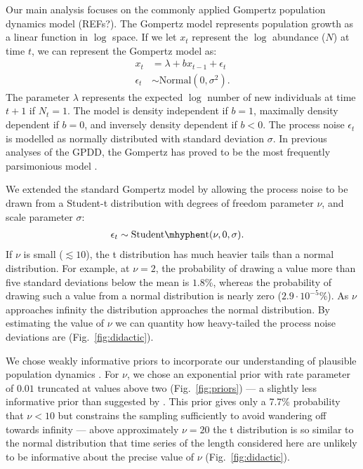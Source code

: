 Our main analysis focuses on the commonly applied Gompertz population dynamics
model (REFs?). The Gompertz model represents population growth as a linear
function in $\log$ space. If we let $x_t$ represent the $\log$ abundance ($N$)
at time $t$, we can represent the Gompertz model as:
\begin{align*}
x_t &= \lambda + b x_{t-1} + \epsilon_t\\
\epsilon_t &\sim \mathrm{Normal}(0, \sigma^2).
\end{align*}
The parameter $\lambda$ represents the expected $\log$ number of new
individuals at time $t + 1$ if $N_t = 1$. The model is density independent if
$b = 1$, maximally density dependent if $b = 0$, and inversely density
dependent if $b < 0$. The process noise $\epsilon_t$ is modelled as normally
distributed with standard deviation $\sigma$. In previous analyses of the GPDD,
the Gompertz has proved to be the most frequently parsimonious model
\citep{brook2006}.

We extended the standard Gompertz model by allowing the process noise to be
drawn from a Student-t distribution with degrees of freedom parameter $\nu$, and scale parameter $\sigma$:
\begin{align*}
\epsilon_t &\sim \mathrm{Student\mhyphen t}(\nu, 0, \sigma).
\end{align*}
If $\nu$ is small ($\lesssim 10$), the t distribution has much heavier tails
than a normal distribution. For example, at $\nu = 2$, the probability of
drawing a value more than five standard deviations below the mean is $1.8$\%,
whereas the probability of drawing such a value from a normal distribution is
nearly zero ($2.9\cdot10^{-5}$\%). As $\nu$ approaches infinity the
distribution approaches the normal distribution. By estimating the value of
$\nu$ we can quantity how heavy-tailed the process noise deviations are
(Fig.~\ref{fig:didactic}).

We chose weakly informative priors to incorporate our understanding of
plausible population dynamics \citep[Supporting Material]{gelman2014}. For
$\nu$, we chose an exponential prior with rate parameter of $0.01$ truncated at
values above two (Fig.~\ref{fig:priors}) --- a slightly less informative prior
than suggested by \citet{fernandez1998}. This prior gives only a 7.7\%
probability that $\nu < 10$ but constrains the sampling sufficiently to avoid
wandering off towards infinity --- above approximately $\nu = 20$ the
t distribution is so similar to the normal distribution that time series of the
length considered here are unlikely to be informative about the precise value
of $\nu$ (Fig.~\ref{fig:didactic}).

